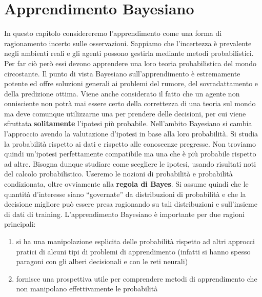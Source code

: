 \chapter{Apprendimento Bayesiano}
In questo capitolo considereremo l'apprendimento come una forma di ragionamento incerto sulle osservazioni. Sappiamo che l'incertezza è prevalente negli ambienti reali e gli agenti possono gestirla mediante metodi probabilistici. Per far ciò però essi devono apprendere una loro teoria probabilistica del mondo circostante. Il punto di vista Bayesiano sull'apprendimento è estremamente potente ed offre soluzioni generali ai problemi del rumore, del sovradattamento e della predizione ottima. Viene anche considerato il fatto che un agente non onnisciente non potrà mai essere certo della correttezza di una teoria sul mondo ma deve comunque utilizzarne una per prendere delle decisioni, per cui viene sfruttata \textbf{solitamente} l'ipotesi più probabile. Nell'ambito Bayesiano si cambia l'approccio avendo la valutazione d'ipotesi in base alla loro probabilità. Si studia la probabilità rispetto ai dati e rispetto alle conoscenze pregresse. Non troviamo quindi un'ipotesi perfettamente compatibile ma una che è più probabile rispetto ad altre. Bisogna dunque studiare come scegliere le ipotesi, usando risultati noti del calcolo
probabilistico. Useremo le nozioni di probabilità e probabilità condizionata, oltre ovviamente alla \textbf{regola di Bayes}.
Si assume quindi che le quantità d'interesse siano ``governate'' da
distribuzioni di probabilità e che la decisione migliore può essere presa ragionando su tali distribuzioni e sull'insieme di dati di
training. L'apprendimento Bayesiano è importante per due ragioni principali:
\begin{enumerate}
  \item si ha una manipolazione esplicita delle probabilità rispetto ad altri approcci pratici di alcuni tipi di problemi di apprendimento (infatti si hanno
  spesso paragoni con gli alberi decisionali e con le reti neurali)
  \item fornisce una prospettiva utile per comprendere metodi di apprendimento
  che non manipolano effettivamente le probabilità
\end{enumerate}
